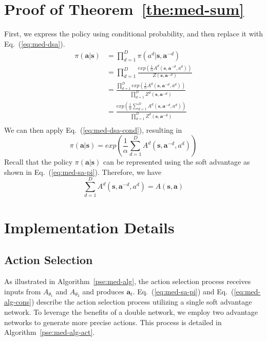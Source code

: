 \section{Proof of Theorem~\ref{the:med-sum}}
\label{sec:app-proof}

First, we express the policy using conditional probability, and then replace it with Eq.~(\ref{eq:med-dsa}).
\begin{equation}
\begin{aligned}
    \pi (\mathbf{a} | \mathbf{s})
    &= \prod_{d=1}^D \pi (a^d | \mathbf{s}, \mathbf{a}^{-d} ) \\
    &= \prod_{d=1}^D \frac
    {exp \left( \frac{1}{\alpha} A^d(\mathbf{s}, \mathbf{a}^{-d}, a^d) \right)}
    {Z(\mathbf{s}, \mathbf{a}^{-d})} \\
    &= \frac
    {\prod_{d=1}^D exp \left(\frac{1}{\alpha} A^d(\mathbf{s}, \mathbf{a}^{-d}, a^d) \right) }
    {\prod_{d=1}^D Z^d(\mathbf{s}, \mathbf{a}^{-d})} \\
    &= \frac
    {exp \left( \frac{1}{\alpha} \sum_{d=1}^D A^d(\mathbf{s}, \mathbf{a}^{-d}, a^d)\right)}
    {\prod_{d=1}^D Z^d(\mathbf{s}, \mathbf{a}^{-d})} \\
\end{aligned}
\end{equation}
We can then apply Eq.~(\ref{eq:med-dsa-cond}), resulting in
\begin{equation}
    \pi (\mathbf{a} | \mathbf{s})
    = exp \left( \frac{1}{\alpha} \sum_{d=1}^D A^d(\mathbf{s}, \mathbf{a}^{-d}, a^d)\right)
\end{equation}
Recall that the policy $\pi (\mathbf{a} | \mathbf{s})$ can be represented using the soft advantage as shown in Eq.~(\ref{eq:med-sa-pi}). Therefore, we have
\begin{equation}
    \sum_{d=1}^D A^d(\mathbf{s}, \mathbf{a}^{-d}, a^d)
     = A(\mathbf{s}, \mathbf{a})
\end{equation}

\section{Implementation Details}

\subsection{Action Selection}
As illustrated in Algorithm~\ref{pse:med-alg}, the action selection process receives inputs from $A_{\theta_1}$ and $A_{\theta_2}$ and produces $\mathbf{a}_t$. 
Eq.~(\ref{eq:med-sa-pi}) and Eq.~(\ref{eq:med-alg-cons}) describe the action selection process utilizing a single soft advantage network. 
To leverage the benefits of a double network, we employ two advantage networks to generate more precise actions. 
This process is detailed in Algorithm~\ref{pse:med-alg-act}.

